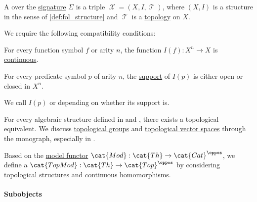 \begin{definition}\label{def:topological_fol_structures}
  A  over the \hyperref[def:fol_signature]{signature} \( \Sigma \) is a triple \( \mscrX = (X, I, \mscrT) \), where \( (X, I) \) is a structure in the sense of \cref{def:fol_structure} and \( \mscrT \) is a \hyperref[def:topological_space]{topology} on \( X \).

  We require the following compatibility conditions:
  \begin{thmenum}
     For every function symbol \( f \) or arity \( n \), the function \( I(f): X^n \to X \) is \hyperref[def:global_continuity]{continuous}.

     For every predicate symbol \( p \) of arity \( n \), the \hyperref[def:function_support]{support} of \( I(p) \) is either open or closed in \( X^n \).

    We call \( I(p) \)  or  depending on whether its support is.
  \end{thmenum}
\end{definition}
\begin{comments}
  \item For every algebraic structure defined in  and , there exists a topological equivalent. We discuss \hyperref[def:topological_group]{topological groups} and \hyperref[def:topological_vector_space]{topological vector spaces} through the monograph, especially in .
\end{comments}

\begin{definition}\label{def:fol_theory_topological_model_functor}\mimprovised
  Based on the \hyperref[def:fol_theory_model_functor]{model functor} \( \cat{Mod}: \cat{Th} \to \cat{Cat}^\oppos \), we define a  \( \cat{TopMod}: \cat{Th} \to \cat{Top}^\oppos \) by considering \hyperref[def:topological_fol_structures]{topological structures} and \hyperref[def:global_continuity]{continuous} \hyperref[def:fol_homomorphism]{homomorphisms}.
\end{definition}

\paragraph{Subobjects}

